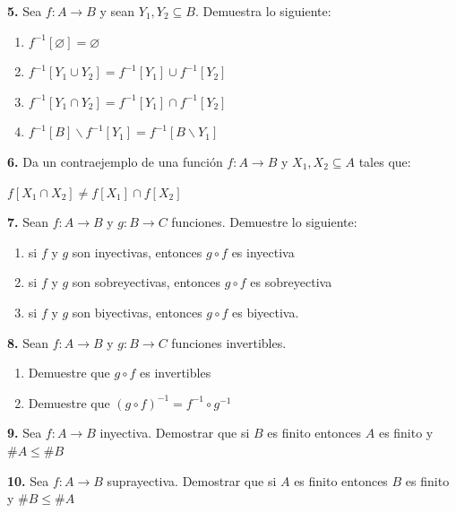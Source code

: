 \documentclass[12pt]{article}
\begin{document}
\vspace{0.5cm}
%
%
\textbf{5.} Sea ${\displaystyle f: A \longrightarrow B}$ y sean $Y_1, Y_2 \subseteq B$. Demuestra lo siguiente:
\begin{enumerate}[label=\alph*)]
    \item ${\displaystyle f^{-1}} [\varnothing] = \varnothing$
    \item ${\displaystyle f^{-1}} [Y_1 \cup Y_2] = {\displaystyle f^{-1}}[Y_1] \cup {\displaystyle f^{-1}}[Y_2]$
    \item ${\displaystyle f^{-1}} [Y_1 \cap Y_2] = {\displaystyle f^{-1}}[Y_1] \cap {\displaystyle f^{-1}}[Y_2]$
    \item ${\displaystyle f^{-1}} [B] \backslash {\displaystyle f^{-1}} [Y_1] = {\displaystyle f^{-1}}[B \backslash Y_1]$
\end{enumerate}

\vspace{0.5cm}
%
%
\textbf{6.} Da un contraejemplo de una función ${\displaystyle f: A \longrightarrow B}$ y $X_1, X_2 \subseteq A$ tales que:
\begin{center}
    ${\displaystyle f} [X_1 \cap X_2] \neq {\displaystyle f}[X_1] \cap {\displaystyle f}[X_2]$
\end{center}

\vspace{0.5cm}
%
%
\textbf{7.} Sean ${\displaystyle f: A \longrightarrow B}$ y ${\displaystyle g: B \longrightarrow C}$ funciones. Demuestre lo siguiente:
\begin{enumerate}[label=\alph*)]
    \item si ${\displaystyle f}$ y ${\displaystyle g}$ son inyectivas, entonces ${\displaystyle g \circ f}$ es inyectiva
    \item si ${\displaystyle f}$ y ${\displaystyle g}$ son sobreyectivas, entonces ${\displaystyle g \circ f}$ es sobreyectiva
    \item si ${\displaystyle f}$ y ${\displaystyle g}$ son biyectivas, entonces ${\displaystyle g \circ f}$ es biyectiva.
\end{enumerate}

\vspace{0.5cm}
%
%
\textbf{8.} Sean ${\displaystyle f: A \longrightarrow B}$ y ${\displaystyle g: B \longrightarrow C}$ funciones invertibles.
\begin{enumerate}[label=\alph*)]
    \item Demuestre que ${\displaystyle g \circ f}$ es invertibles
    \item Demuestre que ${\displaystyle (g \circ f)^{-1}} = {\displaystyle f^{-1} \circ g^{-1}}$ 
\end{enumerate}

\vspace{0.5cm}
% 
%
\textbf{9.} Sea ${\displaystyle f: A \longrightarrow B}$ inyectiva. Demostrar que si $B$ es finito entonces $A$ es finito y $\# A \leq \#B$

\vspace{0.5cm}
%
%
\textbf{10.} Sea ${\displaystyle f: A \longrightarrow B}$ suprayectiva. Demostrar que si $A$ es finito entonces $B$ es finito y $\# B \leq \#A$
\end{document}
